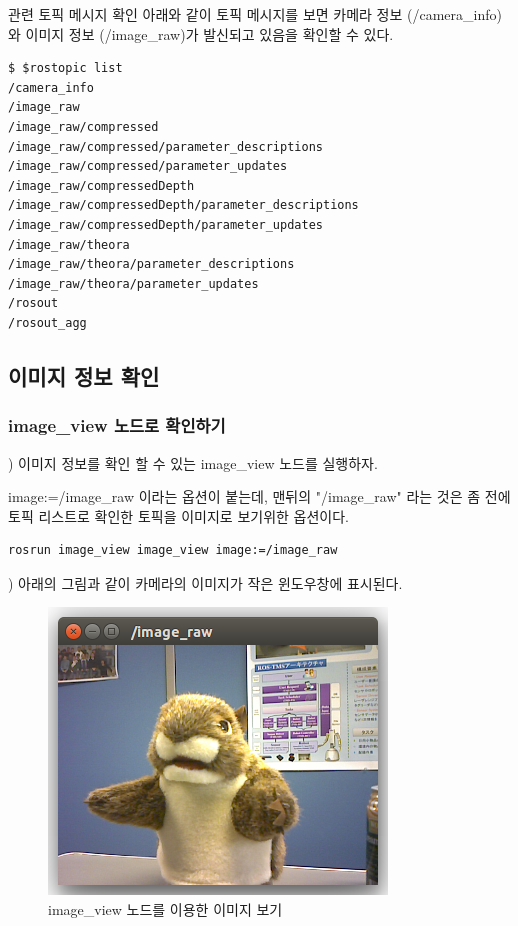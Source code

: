 \noindent
{}\circled{\thenum} 관련 토픽 메시지 확인
\noindent
아래와 같이 토픽 메시지를 보면 카메라 정보 (/camera\_info)와 이미지 정보 (/image\_raw)가 발신되고 있음을 확인할 수 있다.

\begin{lstlisting}[language=ROS]
$ $rostopic list
/camera_info
/image_raw
/image_raw/compressed
/image_raw/compressed/parameter_descriptions
/image_raw/compressed/parameter_updates
/image_raw/compressedDepth
/image_raw/compressedDepth/parameter_descriptions
/image_raw/compressedDepth/parameter_updates
/image_raw/theora
/image_raw/theora/parameter_descriptions
/image_raw/theora/parameter_updates
/rosout
/rosout_agg
\end{lstlisting}

\subsection{이미지 정보 확인}

\subsubsection{image\_view 노드로 확인하기}

\setcounter{num}{0}

\noindent
{}\thenum) 이미지 정보를 확인 할 수 있는 image\_view 노드를 실행하자.

\noindent
image:=/image\_raw 이라는 옵션이 붙는데, 맨뒤의 "/image\_raw" 라는 것은 좀 전에 토픽 리스트로 확인한 토픽을 이미지로 보기위한 옵션이다.

\begin{lstlisting}[language=ROS]
rosrun image_view image_view image:=/image_raw
\end{lstlisting}

\noindent
{}\thenum) 아래의 그림과 같이 카메라의 이미지가 작은 윈도우창에 표시된다.

\begin{figure}[h]
\centering\includegraphics[width=0.5\columnwidth]{pictures/chapter9/imageview.png}
\caption{image\_view 노드를 이용한 이미지 보기}
\end{figure}

